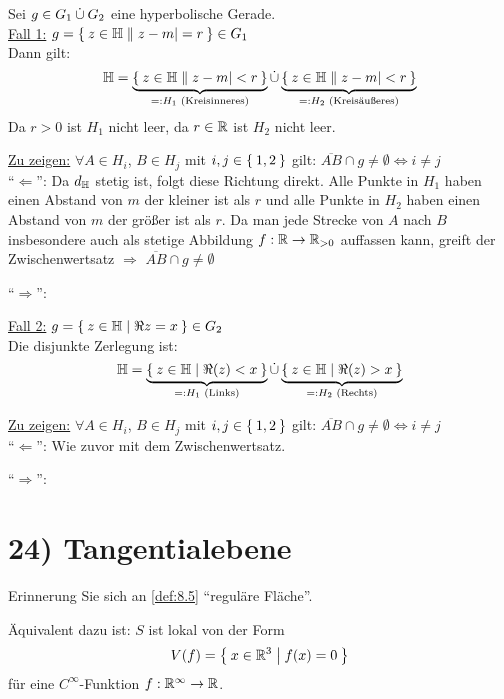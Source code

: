 \documentclass[a5paper,oneside]{scrbook}
\begin{document}
\begin{beweis}\leavevmode
 Sei $g \in G_1 \mathbin{\dot{\cup}} G_2$ eine hyperbolische Gerade.\\
              \underline{Fall 1:} $g = \Set{z \in \ensuremath{\mathbb{H}}| |z-m| = r} \in G_1$\\
              Dann gilt:
              \[\mathbb{H} = \underbrace{\Set{z \in \ensuremath{\mathbb{H}}| |z-m| < r}}_{=:H_1 \text{ (Kreisinneres)}} \mathbin{\dot{\cup}} \underbrace{\Set{z \in \ensuremath{\mathbb{H}}| |z-m| < r}}_{=:H_2 \text{ (Kreisäußeres)}}\]
              Da $r > 0$ ist $H_1$ nicht leer, da $r \in \mathbb{R}$ ist $H_2$ nicht leer.

              \underline{Zu zeigen:} $\forall A \in H_i$, $B \in H_j$ mit
                      $i,j \in \Set{1,2}$ gilt: 
                      $\overline{AB} \cap g \neq \emptyset \Leftrightarrow i \neq j$\\
              \enquote{$\Leftarrow$}: Da $d_{\mathbb{H}}$ stetig ist, folgt diese Richtung
              direkt. Alle Punkte in $H_1$ haben einen Abstand von $m$ der kleiner
              ist als $r$ und alle Punkte in $H_2$ haben einen Abstand von $m$ der
              größer ist als $r$. Da man jede Strecke von $A$ nach $B$ insbesondere
              auch als stetige Abbildung $f: \mathbb{R} \rightarrow \mathbb{R}_{>0}$ auffassen
              kann, greift der Zwischenwertsatz $\Rightarrow$ $\overline{AB} \cap g \neq \emptyset$

              \enquote{$\Rightarrow$}:

              \underline{Fall 2:} $g = \Set{z \in \ensuremath{\mathbb{H}}| \Re{z} = x} \in G_2$\\
              Die disjunkte Zerlegung ist:
              \[\mathbb{H} = \underbrace{\Set{z \in \ensuremath{\mathbb{H}}| \Re(z) < x}}_{=: H_1 \text{ (Links)}} \mathbin{\dot{\cup}} \underbrace{\Set{z \in \ensuremath{\mathbb{H}}| \Re(z) > x}}_{=: H_2 \text{ (Rechts)}}\]

              \underline{Zu zeigen:} $\forall A \in H_i$, $B \in H_j$ mit
                      $i,j \in \Set{1,2}$ gilt: 
                      $\overline{AB} \cap g \neq \emptyset \Leftrightarrow i \neq j$\\
              \enquote{$\Leftarrow$}: Wie zuvor mit dem Zwischenwertsatz.

              \enquote{$\Rightarrow$}:
\end{beweis}


\section*{24) Tangentialebene}
Erinnerung Sie sich an \cref{def:8.5} \enquote{reguläre Fläche}.

Äquivalent dazu ist: $S$ ist lokal von der Form
\[V(f) = \Set{x \in \ensuremath{\mathbb{R}}^3 | f(x) = 0 }\]
für eine $C^\infty$-Funktion $f: \mathbb{R}^\infty \rightarrow \mathbb{R}$.
\end{document}
